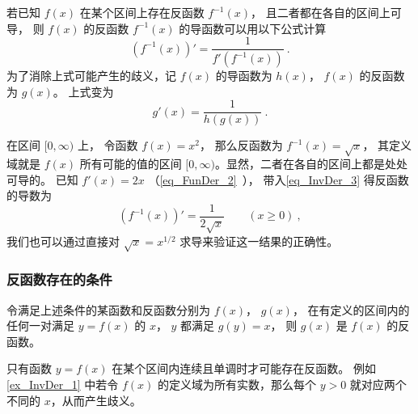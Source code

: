 

若已知 $f(x)$ 在某个区间上存在反函数 $f^{-1}(x)$， 且二者都在各自的区间上可导， 则 $f(x)$ 的反函数 $f^{-1}(x)$ 的导函数可以用以下公式计算
\begin{equation}\label{eq_InvDer_3}
(f^{-1}(x))' = \frac{1}{f'(f^{-1}(x))} ~.
\end{equation} 
为了消除上式可能产生的歧义，记 $f(x)$ 的导函数为 $h(x)$，  $f(x)$ 的反函数为 $g(x)$。 上式变为
 \begin{equation}
g'(x) = \frac{1}{h(g(x))}~.
\end{equation}

\begin{example}{}\label{ex_InvDer_1}
在区间 $[0, \infty)$ 上， 令函数 $f(x) = x^2$， 那么反函数为 $f^{-1}(x) = \sqrt{x}$， 其定义域就是 $f(x)$ 所有可能的值的区间 $[0, \infty)$。显然，二者在各自的区间上都是处处可导的。 已知 $f'(x) = 2x$ （\autoref{eq_FunDer_2}~）， 带入\autoref{eq_InvDer_3} 得反函数的导数为
\begin{equation}
(f^{-1}(x))' = \frac{1}{2\sqrt{x}} \qquad (x \ge 0)~,
\end{equation}
我们也可以通过直接对 $\sqrt{x} = x^{1/2}$ 求导来验证这一结果的正确性。
\end{example}

\subsubsection{反函数存在的条件}
令满足上述条件的某函数和反函数分别为 $f(x)$，  $g(x)$， 在有定义的区间内的任何一对满足 $y = f(x)$ 的 $x$，  $y$ 都满足 $g(y) = x$， 则 $g(x)$ 是 $f(x)$ 的反函数。

只有函数 $y = f(x)$ 在某个区间内连续且单调时才可能存在反函数。 例如\autoref{ex_InvDer_1} 中若令 $f(x)$ 的定义域为所有实数，那么每个 $y > 0$  就对应两个不同的 $x$，从而产生歧义。

